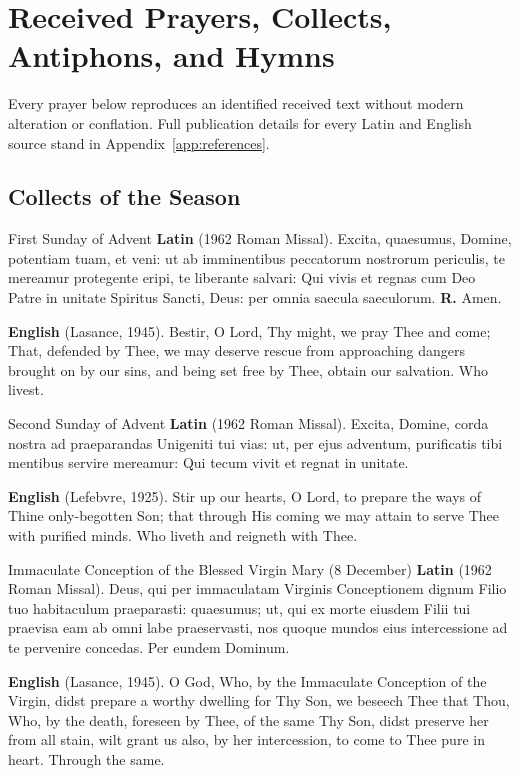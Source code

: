 \section{Received Prayers, Collects, Antiphons, and Hymns}\label{app:prayers}

Every prayer below reproduces an identified received text without modern
alteration or conflation. Full publication details for every Latin and English
source stand in Appendix~\ref{app:references}.

\subsection{Collects of the Season}

\begin{massbox}{First Sunday of Advent}
\textbf{Latin} (1962 Roman Missal). Excita, quaesumus, Domine, potentiam tuam,
et veni: ut ab imminentibus peccatorum nostrorum periculis, te mereamur
protegente eripi, te liberante salvari: Qui vivis et regnas cum Deo Patre in
unitate Spiritus Sancti, Deus: per omnia saecula saeculorum. \textbf{R.} Amen.

\textbf{English} (Lasance, 1945). Bestir, O Lord, Thy might, we pray Thee and
come; That, defended by Thee, we may deserve rescue from approaching dangers
brought on by our sins, and being set free by Thee, obtain our salvation. Who
livest.
\end{massbox}

\begin{massbox}{Second Sunday of Advent}
\textbf{Latin} (1962 Roman Missal). Excita, Domine, corda nostra ad praeparandas
Unigeniti tui vias: ut, per ejus adventum, purificatis tibi mentibus servire
mereamur: Qui tecum vivit et regnat in unitate.

\textbf{English} (Lefebvre, 1925). Stir up our hearts, O Lord, to prepare the
ways of Thine only-begotten Son; that through His coming we may attain to serve
Thee with purified minds. Who liveth and reigneth with Thee.
\end{massbox}

\begin{massbox}{Immaculate Conception of the Blessed Virgin Mary (8 December)}
\textbf{Latin} (1962 Roman Missal). Deus, qui per immaculatam Virginis
Conceptionem dignum Filio tuo habitaculum praeparasti: quaesumus; ut, qui ex
morte eiusdem Filii tui praevisa eam ab omni labe praeservasti, nos quoque
mundos eius intercessione ad te pervenire concedas. Per eundem Dominum.

\textbf{English} (Lasance, 1945). O God, Who, by the Immaculate Conception of
the Virgin, didst prepare a worthy dwelling for Thy Son, we beseech Thee that
Thou, Who, by the death, foreseen by Thee, of the same Thy Son, didst preserve
her from all stain, wilt grant us also, by her intercession, to come to Thee
pure in heart. Through the same.
\end{massbox}

